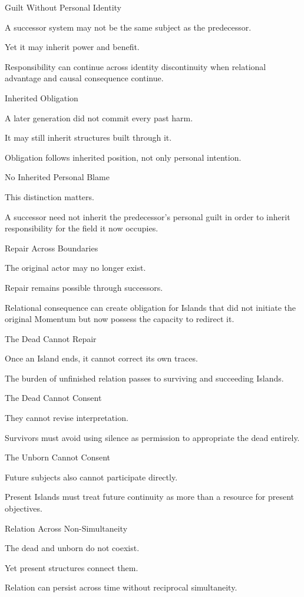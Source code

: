 Guilt Without Personal Identity

A successor system may not be the same subject as the predecessor.

Yet it may inherit power and benefit.

Responsibility can continue across identity discontinuity when relational advantage and causal consequence continue.

Inherited Obligation

A later generation did not commit every past harm.

It may still inherit structures built through it.

Obligation follows inherited position, not only personal intention.

No Inherited Personal Blame

This distinction matters.

A successor need not inherit the predecessor’s personal guilt in order to inherit responsibility for the field it now occupies.

Repair Across Boundaries

The original actor may no longer exist.

Repair remains possible through successors.

Relational consequence can create obligation for Islands that did not initiate the original Momentum but now possess the capacity to redirect it.

The Dead Cannot Repair

Once an Island ends, it cannot correct its own traces.

The burden of unfinished relation passes to surviving and succeeding Islands.

The Dead Cannot Consent

They cannot revise interpretation.

Survivors must avoid using silence as permission to appropriate the dead entirely.

The Unborn Cannot Consent

Future subjects also cannot participate directly.

Present Islands must treat future continuity as more than a resource for present objectives.

Relation Across Non-Simultaneity

The dead and unborn do not coexist.

Yet present structures connect them.

Relation can persist across time without reciprocal simultaneity.

